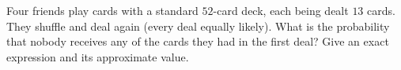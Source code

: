 Four friends play cards with a standard $52$-card deck, each being dealt $13$ cards. They shuffle and deal again (every deal equally likely). What is the probability that nobody receives any of the cards they had in the first deal? Give an exact expression and its approximate value.
